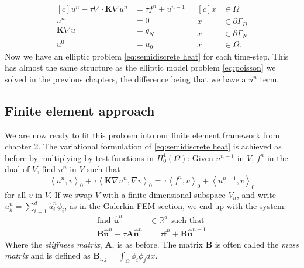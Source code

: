 \documentclass[../Main/main.tex]{subfiles}
\begin{document}
	\begin{equation}\label{eq:semidiscrete heat}
		\begin{aligned}[c]
			u^n - \tau \nabla \cdot \pmb{K} \nabla u^n &= \tau f^n+u^{n-1}\\
			u^n &= 0 \\
			\pmb{K}\nabla u &= g_N\\
			u^0 &= u_0
		\end{aligned}
		\ \ \
		\begin{aligned}[c]
			x &\in \Omega  \\
			x &\in \partial \Gamma_D \\
			x &\in \partial \Gamma_N \\
			x &\in \Omega .
		\end{aligned}
	\end{equation}
	Now we have an elliptic problem \eqref{eq:semidiscrete heat} for each time-step. This has almost the same structure as the elliptic model problem \eqref{eq:poisson} we solved in the previous chapters, the difference being that we have a $u^n$ term.
	\subsection*{Finite element approach}
	We are now ready to fit this problem into our finite element framework from chapter 2.
	The variational formulation of \eqref{eq:semidiscrete heat} is achieved as before by multiplying by test functions in $H^1_0(\Omega)$: Given $u^{n-1}$ in $V$, $f^n$ in the dual of $V$, find $u^n$ in $V$ such that
	\begin{equation}
			\left \langle  u^n, v\right \rangle_0 + \tau \left \langle  \pmb{K} \nabla u^n, \nabla v \right \rangle_0 =\tau \left \langle f^n,v\right \rangle_0 + \left \langle u^{n-1},v \right \rangle_0
	\end{equation}
	for all $v$ in $V$.
	If we swap $V$ with  a finite dimensional subspace $V_h$, and write $u_h^n = \sum_{i = 1}^d \hat{u}_i^n \phi_i $, as in the Galerkin FEM section, we end up with the system.
	\begin{equation}\label{eq:heat fem disc}
		\begin{aligned}
			\text{find }\hat{\bm{u}}^n&\in \mathbb{R}^d \text{ such that }\\
			\pmb{B}\hat{\bm{u}}^n+\tau\pmb{A}\hat{\bm{u}}^n &=\tau \pmb{f}^n +  \pmb{B}\hat{\bm{u}}^{n-1}
		\end{aligned}
	\end{equation}
	Where the \emph{stiffness matrix}, $\pmb{A}$, is as before. The matrix $\pmb{B}$ is often called the \emph{mass matrix} and is defined as $\pmb{B}_{i,j} = \int_{\Omega} \phi_i \phi_jdx$.
\end{document}
